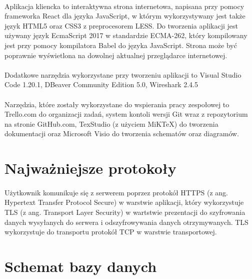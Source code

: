 \documentclass{article}
\begin{document}
	\paragraph*{} Aplikacja kliencka to interaktywna strona internetowa, napisana przy pomocy frameworka React dla języka JavaScript, w którym wykorzystywany jest także język HTML5 oraz CSS3 z preprocesorem LESS. Do tworzenia aplikacji jest używany język EcmaScript 2017 w standardzie ECMA-262, który kompilowany jest przy pomocy kompilatora Babel do języka JavaScript. Strona może być poprawnie wyświetlona na dowolnej aktualnej przeglądarce internetowej.
	\paragraph*{} Dodatkowe narzędzia wykorzystane przy tworzeniu aplikacji to Visual Studio Code 1.20.1, DBeaver Community Edition 5.0, Wireshark 2.4.5 
	\paragraph*{} Narzędzia, które zostały wykorzystane do wspierania pracy zespołowej to Trello.com do organizacji zadań, system kontoli wersji Git wraz z repozytorium na stronie GitHub.com, TexStudio (z użyciem MiKTeX) do tworzenia dokumentacji oraz Microsoft Visio do tworzenia schematów oraz diagramów.
	\section{Najważniejsze protokoły}
	\paragraph*{} 
	Użytkownik komunikuje się z serwerem poprzez protokół HTTPS (z ang. Hypertext Transfer Protocol Secure) w warstwie aplikacji, który wykorzystuje TLS (z ang. Transport Layer Security) w wartstwie prezentacji do szyfrowania danych wysyłanych do serwera i odszyfrowywania danych otrzymywanych. TLS wykorzystuje do transportu protokół TCP w warstwie transportowej.
	\section{Schemat bazy danych}
\end{document}
